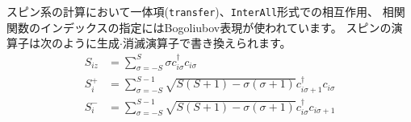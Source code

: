 スピン系の計算において一体項(\verb|transfer|)、\verb|InterAll|形式での相互作用、
相関関数のインデックスの指定にはBogoliubov表現が使われています。
スピンの演算子は次のように生成$\cdot$消滅演算子で書き換えられます。
\begin{align}
  S_{i z} &= \sum_{\sigma = -S}^{S} \sigma c_{i \sigma}^\dagger c_{i \sigma}
  \\
  S_{i}^+ &= \sum_{\sigma = -S}^{S-1} 
  \sqrt{S(S+1) - \sigma(\sigma+1)} 
  c_{i \sigma+1}^\dagger c_{i \sigma}
  \\
  S_{i}^- &= \sum_{\sigma = -S}^{S-1} 
  \sqrt{S(S+1) - \sigma(\sigma+1)} 
  c_{i \sigma}^\dagger c_{i \sigma+1}
\end{align}
